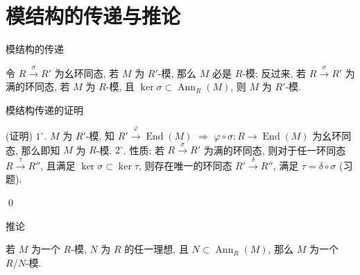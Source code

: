 
\section[结构传递]{模结构的传递与推论}


\begin{frame}{模结构的传递}

\begin{lem}[模结构的传递]
令 $R \xrightarrow{\ \sigma\ } R'$ 为幺环同态, 若 $M$ 为 $R'$-模,
那么 $M$ 必是 $R$-模;
反过来, 若 $R \xrightarrow{\ \sigma\ } R'$ 为满的环同态,
若 $M$ 为 $R$-模, 且 $\ker \sigma \subset \operatorname{Ann}_R(M)$,
则 $M$ 为 $R'$-模.
\end{lem}

\end{frame}


\begin{frame}{模结构传递的证明}

\startproof[bg=yellow, fg=red](证明)
$1^{\circ}$. $M$ 为 $R'$-模, 知
$R' \xrightarrow{\ \varphi\ } \operatorname{End}(M)$
$\Longrightarrow$ $\varphi \circ \sigma: R \to \operatorname{End}(M)$
为幺环同态, 那么即知 $M$ 为 $R$-模.
\pause
$2^{\circ}$. 性质: 若 $R \xrightarrow{\ \sigma\ } R'$ 为满的环同态,
则对于任一环同态 $R \xrightarrow{\ \tau\ } R''$,
且满足 $\ker \sigma \subset \ker \tau$, 则存在唯一的环同态
$R' \xrightarrow{\ \delta\ } R''$, 满足 $\tau = \delta \circ \sigma$
(习题).

\begin{center}
\end{center}
\qed

\end{frame}


\begin{frame}{推论}

\begin{cor}
若 $M$ 为一个 $R$-模, $N$ 为 $R$ 的任一理想,
且 $N \subset \operatorname{Ann}_R(M)$,
那么 $M$ 为一个 $R/N$-模.
\end{cor}

\end{frame}



